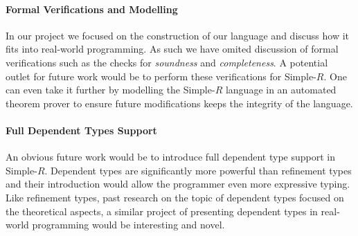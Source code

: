 \documentclass[a4paper,12pt]{report}
\begin{document}
\paragraph{Formal Verifications and Modelling} In our project we focused on the construction 
of our language and discuss how it fits into real-world programming. As such we 
have omited discussion of formal verifications such as the checks for \emph{soundness} 
and \emph{completeness}. A potential outlet for future work would be to 
perform these verifications for Simple-$R$. One can even take it further 
by modelling the Simple-$R$ language in an automated theorem prover to 
ensure future modifications keeps the integrity of the language. 

\paragraph{Full Dependent Types Support} An obvious future work would be to 
introduce full dependent type support in Simple-$R$. Dependent types are 
significantly more powerful than refinement types and their introduction 
would allow the programmer even more expressive typing. 
Like refinement types, past research on the topic of dependent types focused on 
the theoretical aspects, a similar project of presenting 
dependent types in real-world programming would be interesting and novel. 

\appendix
\singlespacing

\printbibliography
\end{document}
